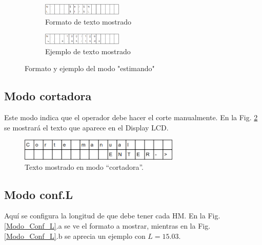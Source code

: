 \documentclass[main_conf.tex]{subfiles}
\begin{document}
\begin{figure}[t]
  \centering
  \begin{subfigure}[b]{0.5\textwidth}
    \centering
    \includegraphics[width=1.5in]{../img/modo/estimando_view.png}
    \caption{Formato de texto mostrado}
  \end{subfigure}

  \begin{subfigure}[b]{0.5\textwidth}
    \centering
    \includegraphics[width=1.5in]{../img/modo/estimando_sample.png}
    \caption{Ejemplo de texto mostrado}
  \end{subfigure}

  \caption{Formato y ejemplo del modo "estimando"}
  \label{Modo_estimando}
\end{figure}

\subsection{Modo cortadora}
Este modo indica que el operador debe hacer el corte manualmente.
En la Fig. \ref{Modo_cortadora} se mostrará el texto que
aparece en el Display LCD.

\begin{figure}[!t]
  \centering
  \includegraphics[width=3.0in]{../img/modo/cortadora.png}
  \caption{Texto mostrado en modo “cortadora”.}
  \label{Modo_cortadora}
\end{figure}

\subsection{Modo conf.L}
Aquí se configura la longitud de que debe tener cada HM.
En la Fig. \ref{Modo_Conf_L}.a se ve el formato a mostrar,
mientras en la Fig. \ref{Modo_Conf_L}.b se aprecia un
ejemplo con $L = 15.03$.
\end{document}
